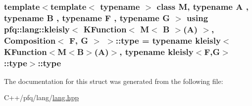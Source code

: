 \subsubsection[{\texorpdfstring{type}{type}}]{\setlength{\rightskip}{0pt plus 5cm}template$<$template$<$ typename $>$ class M, typename A , typename B , typename F , typename G $>$ using {\bf pfq\+::lang\+::kleisly}$<$ {\bf K\+Function}$<$ M$<$ B $>$(A) $>$, {\bf Composition}$<$ F, G $>$ $>$\+::{\bf type} =  typename {\bf kleisly}$<$ {\bf K\+Function}$<$M$<$B$>$(A)$>$, typename {\bf kleisly}$<$F,G$>$\+::{\bf type}$>$\+::{\bf type}}\hypertarget{structpfq_1_1lang_1_1kleisly_3_01KFunction_3_01M_3_01B_01_4_07A_08_01_4_00_01Composition_3_01F_00_01G_01_4_01_4_ae7adb22d85d77fbfa69697dcfb2530f3}{}\label{structpfq_1_1lang_1_1kleisly_3_01KFunction_3_01M_3_01B_01_4_07A_08_01_4_00_01Composition_3_01F_00_01G_01_4_01_4_ae7adb22d85d77fbfa69697dcfb2530f3}


The documentation for this struct was generated from the following file\+:\begin{DoxyCompactItemize}
\item 
C++/pfq/lang/\hyperlink{lang_8hpp}{lang.\+hpp}\end{DoxyCompactItemize}
